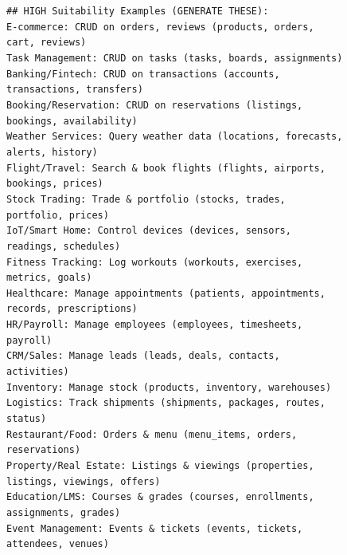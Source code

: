 \begin{figure}[p]
{\begin{minipage}{0.97\textwidth}
        \texttt{\#\# HIGH Suitability Examples (GENERATE THESE):}\\
        \texttt{E-commerce: CRUD on orders, reviews (products, orders, cart, reviews)}\\
        \texttt{Task Management: CRUD on tasks (tasks, boards, assignments)}\\
        \texttt{Banking/Fintech: CRUD on transactions (accounts, transactions, transfers)}\\
        \texttt{Booking/Reservation: CRUD on reservations (listings, bookings, availability)}\\
        \texttt{Weather Services: Query weather data (locations, forecasts, alerts, history)}\\
        \texttt{Flight/Travel: Search \& book flights (flights, airports, bookings, prices)}\\
        \texttt{Stock Trading: Trade \& portfolio (stocks, trades, portfolio, prices)}\\
        \texttt{IoT/Smart Home: Control devices (devices, sensors, readings, schedules)}\\
        \texttt{Fitness Tracking: Log workouts (workouts, exercises, metrics, goals)}\\
        \texttt{Healthcare: Manage appointments (patients, appointments, records, prescriptions)}\\
        \texttt{HR/Payroll: Manage employees (employees, timesheets, payroll)}\\
        \texttt{CRM/Sales: Manage leads (leads, deals, contacts, activities)}\\
        \texttt{Inventory: Manage stock (products, inventory, warehouses)}\\
        \texttt{Logistics: Track shipments (shipments, packages, routes, status)}\\
        \texttt{Restaurant/Food: Orders \& menu (menu\_items, orders, reservations)}\\
        \texttt{Property/Real Estate: Listings \& viewings (properties, listings, viewings, offers)}\\
        \texttt{Education/LMS: Courses \& grades (courses, enrollments, assignments, grades)}\\
        \texttt{Event Management: Events \& tickets (events, tickets, attendees, venues)}\\[4pt]


\end{minipage}}
\end{figure}
